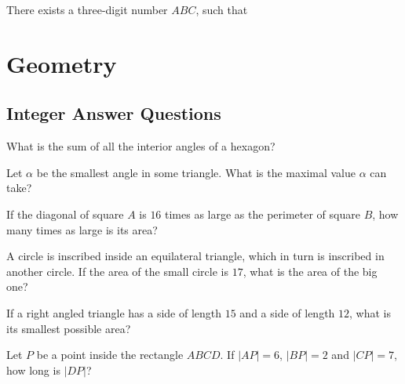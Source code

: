 \documentclass{article}
\newcommand{\degree}{\ensuremath{^{\circ}}}
\begin{document}
\begin{problem}
There exists a three-digit number $ABC$, such that
\begin{tasks2}
\end{tasks2}
\end{problem}

\newpage

\section{Geometry}
\subsection{Integer Answer Questions}

\begin{problem}
What is the sum of all the interior angles of a hexagon?
\end{problem}

\begin{problem}
Let $\alpha$ be the smallest angle in some triangle. What is the maximal value $\alpha$ can take?
\end{problem}
\answer{60\degree}

\begin{problem}
If the diagonal of square $A$ is $16$ times as large as the perimeter of square $B$, how many times as large is its area?
\end{problem}

\begin{problem}
A circle is inscribed inside an equilateral triangle, which in turn is inscribed in another circle. If the area of the small circle is $17$, what is the area of the big one?
\end{problem}

\begin{problem}
If a right angled triangle has a side of length $15$ and a side of length $12$, what is its smallest possible area?
\end{problem}

\begin{problem}
Let $P$ be a point inside the rectangle $ABCD$. If $|AP| = 6$, $|BP| = 2$ and $|CP| = 7$, how long is $|DP|$?
\end{problem}
\end{document}
